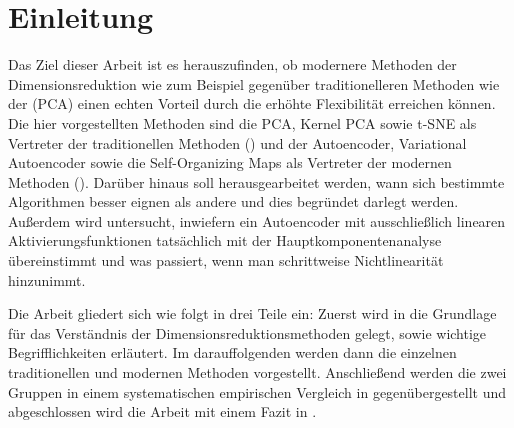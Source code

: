 \chapter{Einleitung}
\label{ch:Enleitung}


Das Ziel dieser Arbeit ist es herauszufinden, ob modernere Methoden der Dimensionsreduktion wie zum
Beispiel  gegenüber traditionelleren Methoden wie der
 (PCA) einen echten Vorteil durch die erhöhte Flexibilität
erreichen können. Die hier vorgestellten Methoden sind die PCA, Kernel PCA sowie t-SNE als Vertreter
der traditionellen Methoden () und der Autoencoder,
Variational Autoencoder sowie die Self-Organizing Maps als Vertreter der modernen Methoden
(). Darüber hinaus soll herausgearbeitet werden, wann sich
bestimmte Algorithmen besser eignen als andere und dies begründet darlegt werden. Außerdem wird
untersucht, inwiefern ein Autoencoder mit ausschließlich linearen Aktivierungsfunktionen
tatsächlich mit der Hauptkomponentenanalyse übereinstimmt und was passiert, wenn man schrittweise
Nichtlinearität hinzunimmt.

Die Arbeit gliedert sich wie folgt in drei Teile ein: Zuerst wird in
 die Grundlage für das Verständnis der Dimensionsreduktionsmethoden
gelegt, sowie wichtige Begrifflichkeiten erläutert. Im darauffolgenden
 werden dann die einzelnen traditionellen und modernen Methoden
vorgestellt. Anschließend werden die zwei Gruppen in einem systematischen empirischen Vergleich in
 gegenübergestellt und abgeschlossen wird die Arbeit mit einem Fazit in
.